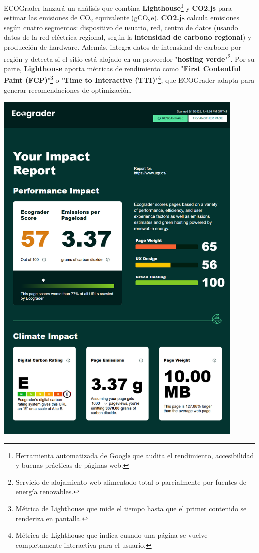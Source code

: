 \documentclass[12pt,a4paper]{report}
\begin{document}
ECOGrader lanzará un análisis que combina
\textbf{Lighthouse}\footnote{Herramienta automatizada de Google que audita el
  rendimiento, accesibilidad y buenas prácticas de páginas web.} y
\textbf{CO2.js} para estimar las emisiones de CO$_2$ equivalente (gCO$_2$e).
\textbf{CO2.js} calcula emisiones según cuatro segmentos: dispositivo de
usuario, red, centro de datos (usando datos de la red eléctrica regional, según
la \textbf{intensidad de carbono regional}) y producción de hardware. Además, integra datos de
intensidad de carbono por región y detecta si el sitio está alojado en un
proveedor "\textbf{hosting verde}"\footnote{Servicio de alojamiento web
  alimentado total o parcialmente por fuentes de energía renovables.}. Por su
parte, \textbf{Lighthouse} aporta métricas de rendimiento como "\textbf{First
  Contentful Paint (FCP)}"\footnote{Métrica de Lighthouse que mide el tiempo
  hasta que el primer contenido se renderiza en pantalla.} o "\textbf{Time to
  Interactive (TTI)}"\footnote{Métrica de Lighthouse que indica cuándo una página
  se vuelve completamente interactiva para el usuario.}, que ECOGrader adapta
para generar recomendaciones de optimización.

\begin{center}
  \includegraphics[width=0.9\textwidth]{imagenes/Ecograder_2.png}
\end{center}
\end{document}
